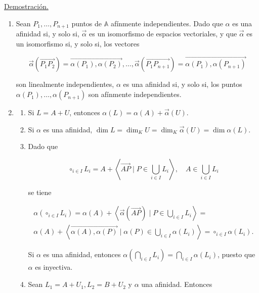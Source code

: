 \documentclass[12pt, a4paper, ones, notitlepage, openany,titlepage]{article}
\begin{document}
\underline{Demostración.} 
\begin{enumerate}
	
	\item Sean $P_{1}, \ldots, P_{n+1}$ puntos de $\mathbb{A}$ afínmente independientes. Dado que $\alpha$ es una afinidad si, y solo si, $\vec{\alpha}$ es un isomorfismo de espacios vectoriales, y que $\vec{\alpha}$ es un isomorfismo si, y solo si, los vectores
	
	$$
	\vec{\alpha}\left(\overrightarrow{P_{1} P_{2}}\right)=\overrightarrow{\alpha\left(P_{1}\right), \alpha\left(P_{2}\right)}, \ldots, \vec{\alpha}\left(\overrightarrow{P_{1} P_{n+1}}\right)=\overrightarrow{\alpha\left(P_{1}\right), \alpha\left(P_{n+1}\right)}
	$$
	
	son linealmente independientes, $\alpha$ es una afinidad si, y solo si, los puntos $\alpha\left(P_{1}\right), \ldots, \alpha\left(P_{n+1}\right)$ son afínmente independientes.
	
	\item 
	\begin{enumerate}
		\item Si $L=A+U$, entonces $\alpha(L)=\alpha(A)+\vec{\alpha}(U)$.
		
		\item Si $\alpha$ es una afinidad, $\dim  L=\dim _{K} U=\dim _{K} \vec{\alpha}(U)=\dim  \alpha(L)$.
		
		\item Dado que
		
		$$
		\circ_{i \in I} L_{i}=A+\left\langle\overrightarrow{A P} \mid P \in \bigcup_{i \in I} L_{i}\right\rangle, \quad A \in \bigcup_{i \in I} L_{i}
		$$
		
		se tiene
		
		\begin{gather*}
			\alpha\left(\circ_{i \in I} L_{i}\right)=\alpha(A)+\left\langle\vec{\alpha}(\overrightarrow{A P}) \mid P \in \bigcup_{i \in I} L_{i}\right\rangle=\\
			\alpha(A)+\left\langle\overrightarrow{\alpha(A), \alpha(P)} \mid \alpha(P) \in \bigcup_{i \in I} \alpha\left(L_{i}\right)\right\rangle=\circ_{i \in I} \alpha\left(L_{i}\right) .
		\end{gather*}
		
		Si $\alpha$ es una afinidad, entonces $\alpha\left(\bigcap_{i \in I} L_{i}\right)=\bigcap_{i \in I} \alpha\left(L_{i}\right)$, puesto que $\alpha$ es inyectiva.
		
		\item Sean $L_{1}=A+U_{1}, L_{2}=B+U_{2}$ y $\alpha$ una afinidad. Entonces
		

\end{enumerate}
\end{enumerate}
\end{document}
